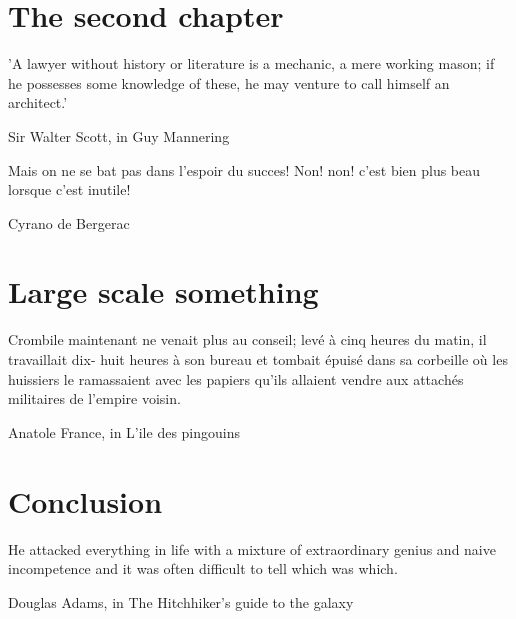 \documentclass{ucbthesis}
\begin{document}
\chapter{The second chapter}
\epigraph{'A lawyer without history or literature is a mechanic, a mere working mason; if he possesses some knowledge of these, he may venture to call himself an architect.'}{Sir Walter Scott, in Guy Mannering}




\epigraph{Mais on ne se bat pas dans l'espoir du succes! Non! non! c'est bien plus beau lorsque c'est inutile!}{Cyrano de Bergerac}




% 

\chapter{Large scale something}
\epigraph{Crombile maintenant ne venait plus au conseil; levé à cinq heures du matin, il travaillait dix- huit heures à son bureau et tombait épuisé dans sa corbeille où les huissiers le ramassaient avec les papiers qu'ils allaient vendre aux attachés militaires de l'empire voisin.}{Anatole France, in L'ile des pingouins}







\chapter{Conclusion}
\epigraph{He attacked everything in life with a mixture of extraordinary genius and naive incompetence and it was often difficult to tell which was which.}{Douglas Adams, in The Hitchhiker's guide to the galaxy}

\printbibliography
\end{document}
